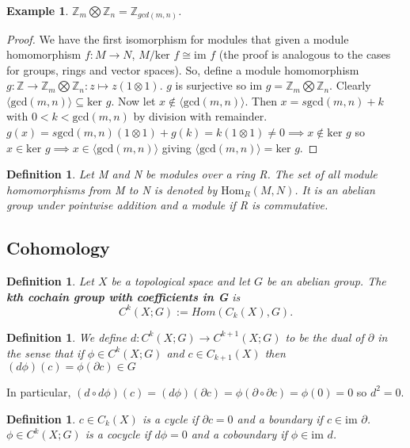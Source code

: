 \documentclass{article}
\newtheorem{definition}[theorem]{Definition}
\newtheorem{example}[theorem]{Example}
\begin{document}
\begin{example}
$\mathbb{Z}_m\bigotimes\mathbb{Z}_n=\mathbb{Z}_{gcd(m,n)}$.
\end{example}
\begin{proof}
We have the first isomorphism for modules that given a module homomorphism $f:M\to N$, $M/\text{ker }f\cong\text{im }f$ (the proof is analogous to the cases for groups, rings and vector spaces).
So, define a module homomorphism $g\colon\mathbb{Z}\to\mathbb{Z}_m\bigotimes\mathbb{Z}_n:z\mapsto z(1\otimes 1)$. $g$ is surjective so $\text{im }g=\mathbb{Z}_m\bigotimes\mathbb{Z}_n$. Clearly $\langle\text{gcd}(m,n)\rangle\subseteq\text{ker }g$. Now let $x\notin \langle\text{gcd}(m,n)\rangle$. Then $x=s\text{gcd}(m,n)+k$ with $0<k<\text{gcd}(m,n)$ by division with remainder. $g(x)=s\text{gcd}(m,n)(1\otimes 1)+g(k)=k(1\otimes 1)\neq 0\implies x\notin\text{ker }g$ so $x\in\text{ker }g\implies x\in\langle\text{gcd}(m,n)\rangle$ giving $\langle\text{gcd}(m,n)\rangle=\text{ker }g$.
\end{proof}


\begin{definition}
Let M and N be modules over a ring R. The set of all module homomorphisms from M to N is denoted by $\text{Hom}_R(M,N)$. It is an abelian group under pointwise addition and a module if R is commutative.
\end{definition}



\subsection{Cohomology}
\begin{definition}
Let $X$ be a topological space and let $G$ be an abelian group. The \textbf{kth cochain group with coefficients in G} is \[C^k(X;G):=Hom(C_k(X),G).\] 
\end{definition}

\begin{definition}
We define $d\colon C^k(X;G)\to C^{k+1}(X;G)$ to be the dual of $\partial$ in the sense that if $\phi\in C^k(X;G)$ and $c\in C_{k+1}(X)$ then $(d\phi)(c)=\phi(\partial c)\in G$
\end{definition}

\noindent In particular, $(d\circ d\phi)(c)=(d\phi)(\partial c)=\phi(\partial\circ\partial c)=\phi(0)=0$ so $d^2=0$.

\begin{definition}
$c\in C_k(X)$ is a cycle if $\partial c=0$ and a boundary if $c\in\text{im }\partial$.
$\phi\in C^k(X;G)$ is a cocycle if $d\phi=0$ and a coboundary if $\phi\in\text{im }d$.
\end{definition}
\end{document}
